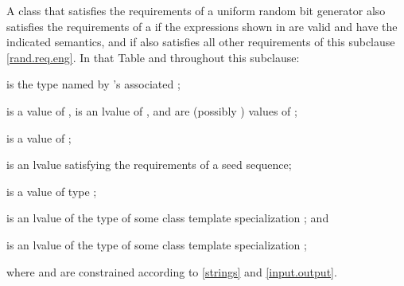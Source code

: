 \pnum
A class 
that satisfies the requirements
of a uniform random bit generator
also satisfies the requirements
of a 
if the expressions shown
in 
are valid and have the indicated semantics,
and if  also satisfies all other requirements
of this subclause \ref{rand.req.eng}.
In that Table and throughout this subclause:
\begin{enumeratea}
  \item
     is the type named by
    's associated ;
  \item
     is a value of ,
     is an lvalue of ,
     and  are (possibly ) values of ;
  \item
     is a value of ;
  \item
     is an lvalue
    satisfying the requirements of a seed sequence;
  \item
     is a value
    of type ;
  \item
     is an lvalue of the type of some class template specialization
     ;
  and
  \item
     is an lvalue of the type of some class template specialization
     ;
\end{enumeratea}
where  and  are constrained
according to \ref{strings} and \ref{input.output}.

